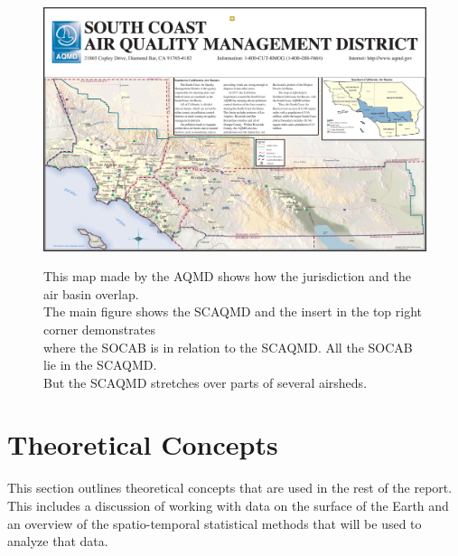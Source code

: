 \documentclass{article}
\begin{document}
\begin{landscape}
   \begin{figure}[ht]
   \captionsetup{justification=centering}
        \caption{This map made by the \ac{AQMD} shows how the jurisdiction and the air basin overlap.\\  The main figure shows the \ac{SCAQMD} and the insert in the top right corner demonstrates \\where the \ac{SOCAB} is in relation to the \ac{SCAQMD}. All the \ac{SOCAB} lie in the \ac{SCAQMD}.\\ But the \ac{SCAQMD} stretches over parts of several airsheds. %
        }
        \centering
       \includegraphics[width = \textwidth]{Figures/map-of-jurisdiction.pdf}
       \label{fig:SCAQMD-jurisdiction}
   \end{figure}
\end{landscape}




%
\section{Theoretical Concepts}
\label{sec:theory}
This section outlines theoretical concepts that are used in the rest of the report. This includes a discussion of working with data on the surface of the Earth and an overview of the spatio-temporal statistical methods that will be used to analyze that data.
\end{document}
